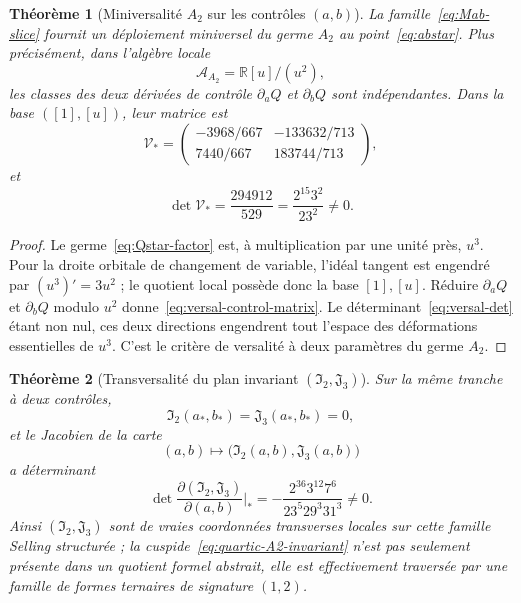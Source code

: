\documentclass[11pt,a4paper]{article}
\newtheorem{theorem}{Théorème}[section]
\newcommand{\R}{\mathbb R}
\begin{document}
\begin{theorem}[Miniversalité $A_2$ sur les contrôles $(a,b)$]\label{thm:selling-A2-versal}
La famille~\eqref{eq:Mab-slice} fournit un déploiement miniversel du germe $A_2$ au point~\eqref{eq:abstar}. Plus précisément, dans l'algèbre locale
\[
 \mathcal A_{A_2}=\R[u]/(u^2),
\]
les classes des deux dérivées de contrôle $\partial_aQ$ et $\partial_bQ$ sont indépendantes. Dans la base $([1],[u])$, leur matrice est
\begin{equation}\label{eq:versal-control-matrix}
 \mathcal V_*=
 \begin{pmatrix}
 -3968/667&-133632/713\\
 7440/667&183744/713
 \end{pmatrix},
\end{equation}
et
\begin{equation}\label{eq:versal-det}
 \boxed{\det\mathcal V_*=\frac{294912}{529}=\frac{2^{15}3^2}{23^2}\neq0.}
\end{equation}
\end{theorem}

\begin{proof}
Le germe~\eqref{eq:Qstar-factor} est, à multiplication par une unité près, $u^3$. Pour la droite orbitale de changement de variable, l'idéal tangent est engendré par $(u^3)'=3u^2$ ; le quotient local possède donc la base $[1],[u]$. Réduire $\partial_aQ$ et $\partial_bQ$ modulo $u^2$ donne~\eqref{eq:versal-control-matrix}. Le déterminant~\eqref{eq:versal-det} étant non nul, ces deux directions engendrent tout l'espace des déformations essentielles de $u^3$. C'est le critère de versalité à deux paramètres du germe $A_2$.
\end{proof}

\begin{theorem}[Transversalité du plan invariant $(\mathfrak I_2,\mathfrak J_3)$]\label{thm:IJ-transverse-star}
Sur la même tranche à deux contrôles,
\[
 \mathfrak I_2(a_*,b_*)=\mathfrak J_3(a_*,b_*)=0,
\]
et le Jacobien de la carte
\[
 (a,b)\longmapsto\bigl(\mathfrak I_2(a,b),\mathfrak J_3(a,b)\bigr)
\]
a déterminant
\begin{equation}\label{eq:IJ-Jac-det}
 \boxed{
 \det\frac{\partial(\mathfrak I_2,\mathfrak J_3)}{\partial(a,b)}\Big|_*
 =-\frac{2^{36}3^{12}7^6}{23^5 29^3 31^3}\neq0.}
\end{equation}
Ainsi $(\mathfrak I_2,\mathfrak J_3)$ sont de vraies coordonnées transverses locales sur cette famille Selling structurée ; la cuspide~\eqref{eq:quartic-A2-invariant} n'est pas seulement présente dans un quotient formel abstrait, elle est effectivement traversée par une famille de formes ternaires de signature $(1,2)$.
\end{theorem}
\end{document}
